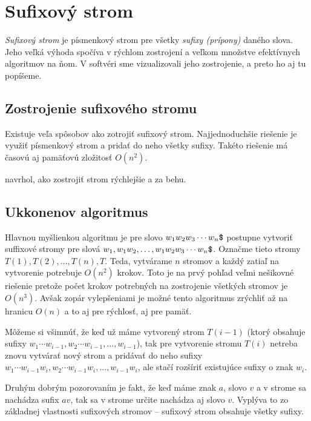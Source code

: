 \chapter{Sufixový strom}\label{chap:sx}

\emph{Sufixový strom} je písmenkový strom pre všetky \emph{sufixy (prípony)} 
daného slova. Jeho veľká výhoda spočíva v rýchlom zostrojení a veľkom množstve 
efektívnych algoritmov na ňom. V softvéri sme vizualizovali jeho zostrojenie, a 
preto ho aj tu popíšeme.

\section{Zostrojenie sufixového stromu}
Existuje veľa spôsobov ako zotrojiť sufixový strom. Najjednoduchšie riešenie 
je využiť písmenkový strom a pridať do neho všetky sufixy. Takéto riešenie má 
časovú aj pamäťovú zložitosť $O(n^2)$. 

\citet{ukkonen} navrhol, ako zostrojiť strom rýchlejšie a za behu. 

\section{Ukkonenov algoritmus}

Hlavnou myšlienkou algoritmu je pre slovo $w_1w_2w_3\cdots w_n\hbox{\tt\$}$ postupne 
vytvoriť suffixové stromy pre slová $w_1, w_1w_2,\ldots, 
w_1w_2w_3\cdots w_n\hbox{\tt\$}$. Označme tieto stromy $T(1), T(2),\ldots, T(n), T$. 
Teda, vytvárame $n$ stromov a každý zatiaľ na vytvorenie potrebuje $O(n^2)$ 
krokov. Toto je na prvý pohľad veľmi nešikovné riešenie pretože počet 
krokov potrebných na zostrojenie všetkých stromov je $O(n^3)$. 
Avšak zopár vylepšeniami je možné tento algoritmus zrýchliť až na hranicu 
$O(n)$ a to aj pre rýchlosť, aj pre pamäť. 


Môžeme si všimnúť, že keď už máme vytvorený strom 
$T(i-1)$ (ktorý obsahuje sufixy $w_1\cdots w_{i-1}, w_2\cdots w_{i-1},\ldots, 
w_{i-1}$), tak pre vytvorenie stromu $T(i)$ netreba znovu vytvárať nový strom 
a pridávať do neho sufixy $w_1\cdots w_{i-1}w_i, w_2\cdots w_{i-1}w_i,\ldots, 
w_{i-1}w_i$, ale stačí rozšíriť existujúce sufixy o znak $w_i$.

Druhým dobrým pozorovaním je fakt, že keď máme znak $a$, slovo $v$ 
a v strome sa nachádza sufix $a v$, tak sa v strome určite 
nachádza aj slovo $v$. Vyplýva to zo základnej vlastnosti sufixových stromov 
--  sufixový strom obsahuje všetky sufixy.
 
